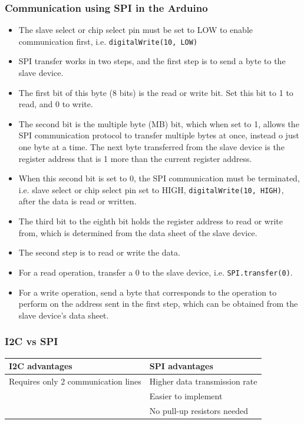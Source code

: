 \documentclass[11pt]{article}
\begin{document}
\subsubsection{Communication using SPI in the Arduino}
\label{sec:orga2f8af0}
\begin{itemize}
\item The slave select or chip select pin must be set to LOW to enable communication first, i.e. \texttt{digitalWrite(10, LOW)}
\item SPI transfer works in two steps, and the first step is to send a byte to the slave device.
\item The first bit of this byte (8 bits) is the read or write bit. Set this bit to 1 to read, and 0 to write.
\item The second bit is the multiple byte (MB) bit, which when set to 1, allows the SPI communication protocol to transfer multiple bytes at once, instead o just one byte at a time. The next byte transferred from the slave device is the register address that is 1 more than the current register address.
\item When this second bit is set to 0, the SPI communication must be terminated, i.e. slave select or chip select pin set to HIGH, \texttt{digitalWrite(10, HIGH)}, after the data is read or written.
\item The third bit to the eighth bit holds the register address to read or write from, which is determined from the data sheet of the slave device.
\item The second step is to read or write the data.
\item For a read operation, transfer a 0 to the slave device, i.e. \texttt{SPI.transfer(0)}.
\item For a write operation, send a byte that corresponds to the operation to perform on the address sent in the first step, which can be obtained from the slave device's data sheet.
\end{itemize}

\subsubsection{I2C vs SPI}
\label{sec:org4b0033d}
\begin{center}
\begin{tabular}{l|l}
I2C advantages & SPI advantages\\[0pt]
\hline
Requires only 2 communication lines & Higher data transmission rate\\[0pt]
 & Easier to implement\\[0pt]
 & No pull-up resistors needed\\[0pt]
\end{tabular}
\end{center}
\end{document}
